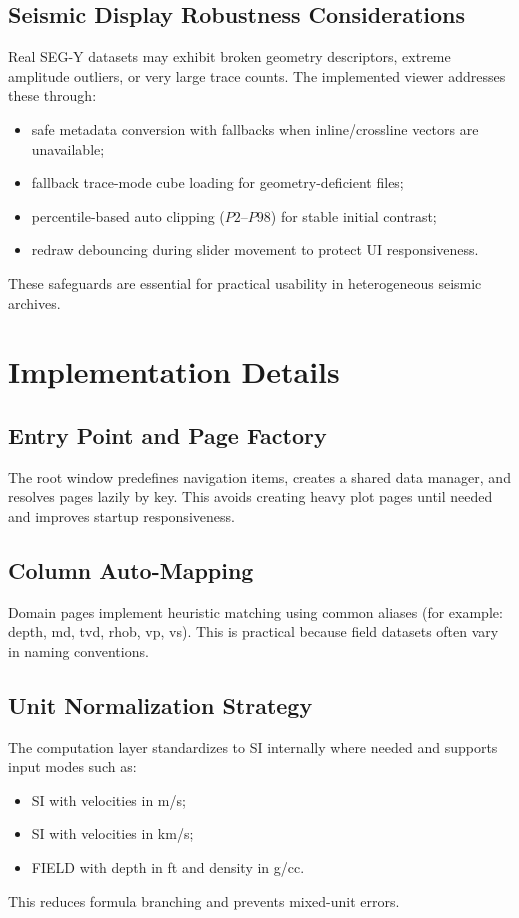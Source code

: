 \documentclass[12pt,a4paper]{report}
\begin{document}
\section{Seismic Display Robustness Considerations}
Real SEG-Y datasets may exhibit broken geometry descriptors, extreme amplitude outliers, or very large trace counts. The implemented viewer addresses these through:
\begin{itemize}
    \item safe metadata conversion with fallbacks when inline/crossline vectors are unavailable;
    \item fallback trace-mode cube loading for geometry-deficient files;
    \item percentile-based auto clipping ($P2$--$P98$) for stable initial contrast;
    \item redraw debouncing during slider movement to protect UI responsiveness.
\end{itemize}

These safeguards are essential for practical usability in heterogeneous seismic archives.

\chapter{Implementation Details}
\section{Entry Point and Page Factory}
The root window predefines navigation items, creates a shared data manager, and resolves pages lazily by key. This avoids creating heavy plot pages until needed and improves startup responsiveness.

\section{Column Auto-Mapping}
Domain pages implement heuristic matching using common aliases (for example: depth, md, tvd, rhob, vp, vs). This is practical because field datasets often vary in naming conventions.

\section{Unit Normalization Strategy}
The computation layer standardizes to SI internally where needed and supports input modes such as:
\begin{itemize}
    \item SI with velocities in m/s;
    \item SI with velocities in km/s;
    \item FIELD with depth in ft and density in g/cc.
\end{itemize}
This reduces formula branching and prevents mixed-unit errors.
\end{document}
